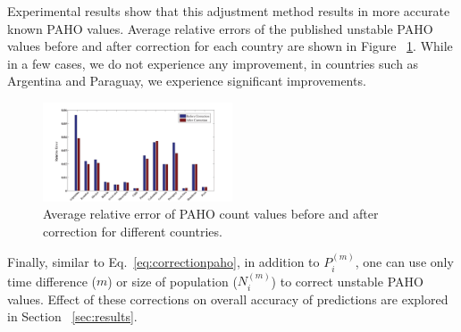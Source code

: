 Experimental results show that this adjustment method results in more accurate
known PAHO values. Average relative errors of the published unstable PAHO
values before and after correction for each
country are shown in Figure ~\ref{fig:avgrelerrors}. While in a few cases,
we do not experience any improvement, in countries such as Argentina and Paraguay,
we experience significant improvements.


\begin{figure}[h]
  \centering
    \includegraphics[width=0.5\textwidth]{fig/errs}
  \caption{Average relative error of PAHO count values before and after 
  correction for different countries.}
  \label{fig:avgrelerrors}
\end{figure}

Finally, similar to Eq.~\ref{eq:correctionpaho}, in addition to $P_i^{(m)}$, one can
use only time difference ($m$) or size of population ($N_i^{(m)}$) to correct
unstable PAHO values. Effect of these corrections on overall accuracy of
predictions are explored in Section ~\ref{sec:results}.
